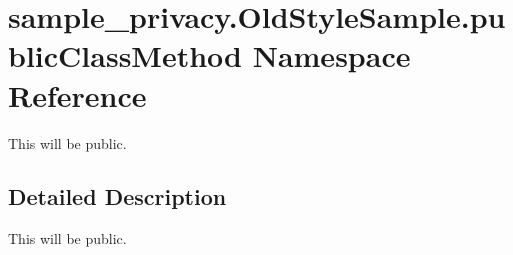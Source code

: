 \hypertarget{namespacesample__privacy_1_1_old_style_sample_1_1public_class_method}{\section{sample\-\_\-privacy.\-Old\-Style\-Sample.\-public\-Class\-Method Namespace Reference}
\label{namespacesample__privacy_1_1_old_style_sample_1_1public_class_method}
}


This will be public.  




\subsection{Detailed Description}
This will be public. 